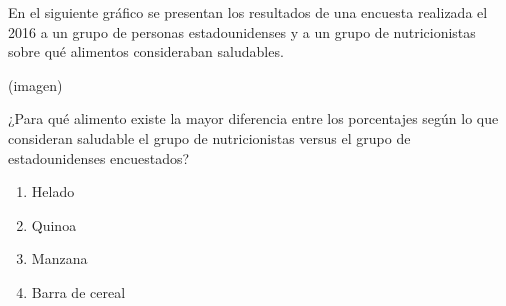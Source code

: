 \begin{problem}
    En el siguiente gráfico se presentan los resultados de una encuesta realizada el 2016 a un grupo de personas estadounidenses y a un grupo de nutricionistas sobre qué alimentos consideraban saludables.

    \begin{center}
    (imagen)
    \end{center}

    ¿Para qué alimento existe la mayor diferencia entre los porcentajes según lo que consideran saludable el grupo de nutricionistas versus el grupo de estadounidenses encuestados?

    \begin{enumerate}[label=\Alph*.]
        \item Helado
        \item Quinoa
        \item Manzana
        \item Barra de cereal
    \end{enumerate}
\end{problem}
